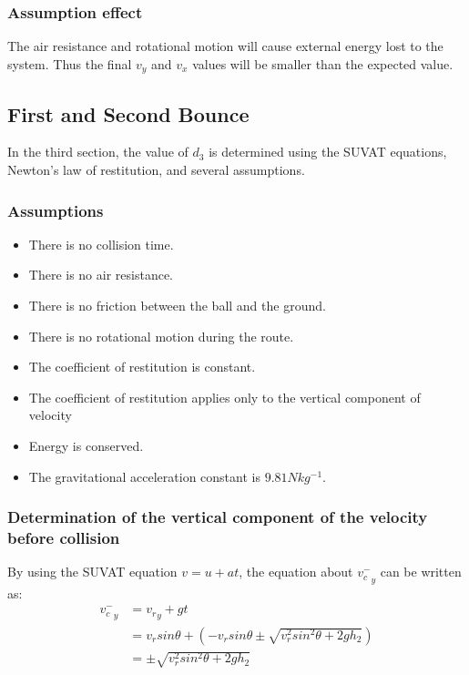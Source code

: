 \documentclass{article}
\begin{document}
        \subsubsection{Assumption effect}
        The air resistance and rotational motion will cause external energy lost to the system. Thus the final $v_y$ and $v_x$ values will be smaller than the expected value.
    \subsection{First and Second Bounce}
        In the third section, the value of $d_3$ is determined using the SUVAT equations, Newton's law of restitution, and several assumptions.
        \subsubsection{Assumptions}
            \begin{itemize}
                \item There is no collision time.
                \item There is no air resistance.
                \item There is no friction between the ball and the ground.
                \item There is no rotational motion during the route.
                \item The coefficient of restitution is constant.
                \item The coefficient of restitution applies only to the vertical component of velocity
                \item Energy is conserved.
                \item The gravitational acceleration constant is $9.81Nkg^{-1}$.
            \end{itemize}
        \subsubsection{Determination of the vertical component of the velocity before collision}
            By using the SUVAT equation $v = u + at$, the equation about ${v^-_c}_y$ can be written as:
            \begin{equation}
                \begin{aligned}
                    {v^-_c}_y &= {v_r}_y + gt\\
                    &= v_rsin\theta + (-v_{r}sin\theta\pm\sqrt{{v^2_{r}sin^2\theta}+2gh_2}) \\
                    &= \pm\sqrt{{v^2_{r}sin^2\theta}+2gh_2}
                \end{aligned}
            \end{equation}
\end{document}
